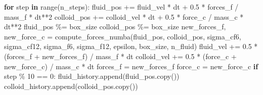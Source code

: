 \documentclass[
  letterpaper,
  enabledeprecatedfontcommands]{report}
\newenvironment{Shaded}{\begin{snugshade}}{\end{snugshade}}
\newcommand{\BuiltInTok}[1]{\textcolor[rgb]{0.00,0.23,0.31}{#1}}
\newcommand{\ControlFlowTok}[1]{\textcolor[rgb]{0.00,0.23,0.31}{\textbf{#1}}}
\newcommand{\DecValTok}[1]{\textcolor[rgb]{0.68,0.00,0.00}{#1}}
\newcommand{\FloatTok}[1]{\textcolor[rgb]{0.68,0.00,0.00}{#1}}
\newcommand{\KeywordTok}[1]{\textcolor[rgb]{0.00,0.23,0.31}{\textbf{#1}}}
\newcommand{\NormalTok}[1]{\textcolor[rgb]{0.00,0.23,0.31}{#1}}
\newcommand{\OperatorTok}[1]{\textcolor[rgb]{0.37,0.37,0.37}{#1}}
\begin{document}
\begin{Shaded}
\begin{Highlighting}[]
\ControlFlowTok{for}\NormalTok{ step }\KeywordTok{in} \BuiltInTok{range}\NormalTok{(n\_steps):}
\NormalTok{    fluid\_pos }\OperatorTok{+=}\NormalTok{ fluid\_vel }\OperatorTok{*}\NormalTok{ dt }\OperatorTok{+} \FloatTok{0.5} \OperatorTok{*}\NormalTok{ forces\_f }\OperatorTok{/}\NormalTok{ mass\_f }\OperatorTok{*}\NormalTok{ dt}\OperatorTok{**}\DecValTok{2}
\NormalTok{    colloid\_pos }\OperatorTok{+=}\NormalTok{ colloid\_vel }\OperatorTok{*}\NormalTok{ dt }\OperatorTok{+} \FloatTok{0.5} \OperatorTok{*}\NormalTok{ force\_c }\OperatorTok{/}\NormalTok{ mass\_c }\OperatorTok{*}\NormalTok{ dt}\OperatorTok{**}\DecValTok{2}
\NormalTok{    fluid\_pos }\OperatorTok{\%=}\NormalTok{ box\_size}
\NormalTok{    colloid\_pos }\OperatorTok{\%=}\NormalTok{ box\_size}
\NormalTok{    new\_forces\_f, new\_force\_c }\OperatorTok{=}\NormalTok{ compute\_forces\_numba(fluid\_pos, colloid\_pos, sigma\_cf6, sigma\_cf12, sigma\_f6, sigma\_f12, epsilon, box\_size, n\_fluid)}
\NormalTok{    fluid\_vel }\OperatorTok{+=} \FloatTok{0.5} \OperatorTok{*}\NormalTok{ (forces\_f }\OperatorTok{+}\NormalTok{ new\_forces\_f) }\OperatorTok{/}\NormalTok{ mass\_f }\OperatorTok{*}\NormalTok{ dt}
\NormalTok{    colloid\_vel }\OperatorTok{+=} \FloatTok{0.5} \OperatorTok{*}\NormalTok{ (force\_c }\OperatorTok{+}\NormalTok{ new\_force\_c) }\OperatorTok{/}\NormalTok{ mass\_c }\OperatorTok{*}\NormalTok{ dt}
\NormalTok{    forces\_f }\OperatorTok{=}\NormalTok{ new\_forces\_f}
\NormalTok{    force\_c }\OperatorTok{=}\NormalTok{ new\_force\_c}
    \ControlFlowTok{if}\NormalTok{ step }\OperatorTok{\%} \DecValTok{10} \OperatorTok{==} \DecValTok{0}\NormalTok{:}
\NormalTok{        fluid\_history.append(fluid\_pos.copy())}
\NormalTok{        colloid\_history.append(colloid\_pos.copy())}


\end{Highlighting}
\end{Shaded}
\end{document}
